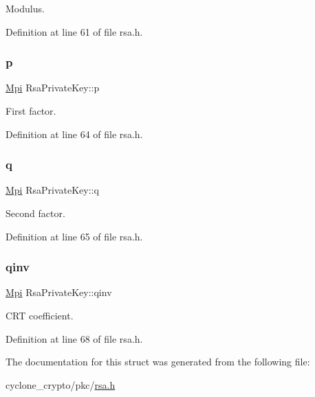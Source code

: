 Modulus. 



Definition at line 61 of file rsa.\+h.

\mbox{\label{structRsaPrivateKey_a1fc8b1ca097c70244db691916f33f891}} 
\subsubsection{\texorpdfstring{p}{p}}
{\footnotesize\ttfamily \hyperlink{structMpi}{Mpi} Rsa\+Private\+Key\+::p}



First factor. 



Definition at line 64 of file rsa.\+h.

\mbox{\label{structRsaPrivateKey_aefd3ef59482ac00637165b624625fef5}} 
\subsubsection{\texorpdfstring{q}{q}}
{\footnotesize\ttfamily \hyperlink{structMpi}{Mpi} Rsa\+Private\+Key\+::q}



Second factor. 



Definition at line 65 of file rsa.\+h.

\mbox{\label{structRsaPrivateKey_a3dac28e0d48293032c18c968faadf57c}} 
\subsubsection{\texorpdfstring{qinv}{qinv}}
{\footnotesize\ttfamily \hyperlink{structMpi}{Mpi} Rsa\+Private\+Key\+::qinv}



C\+RT coefficient. 



Definition at line 68 of file rsa.\+h.



The documentation for this struct was generated from the following file\+:\begin{DoxyCompactItemize}
\item 
cyclone\+\_\+crypto/pkc/\hyperlink{rsa_8h}{rsa.\+h}\end{DoxyCompactItemize}
